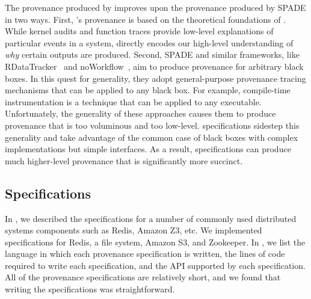 The provenance produced by \fluent{} improves upon the provenance produced by
SPADE in two ways. First, \fluent{}'s provenance is based on the theoretical
foundations of \watprovenance{}. While kernel audits and function traces
provide low-level explanations of particular events in a system,
\watprovenance{} directly encodes our high-level understanding of \emph{why}
certain outputs are produced. Second, SPADE and similar frameworks, like
RDataTracker~\cite{lerner2014collecting} and
noWorkflow~\cite{murta2014noworkflow}, aim to produce provenance for arbitrary
black boxes. In this quest for generality, they adopt general-purpose
provenance tracing mechanisms that can be applied to any black box. For
example, compile-time instrumentation is a technique that can be applied to any
executable.  Unfortunately, the generality of these approaches causes them to
produce provenance that is too voluminous and too low-level. \Watprovenance{}
specifications sidestep this generality and take advantage of the common case
of black boxes with complex implementations but simple interfaces. 
As a result,
\watprovenance{} specifications can produce much higher-level provenance that
is significantly more succinct.

{}

\subsection{\WatProvenance{} Specifications}
In , we described the \watprovenance{} specifications for
a number of commonly used distributed systems components such as Redis, Amazon
Z3, etc. We implemented \fluent{} \watprovenance{} specifications for Redis, a
file system, Amazon S3, and Zookeeper. In , we list the
language in which each provenance specification is written, the lines of code
required to write each specification, and the API supported by each
specification. All of the provenance specifications are relatively short, and
we found that writing the specifications was straightforward.

